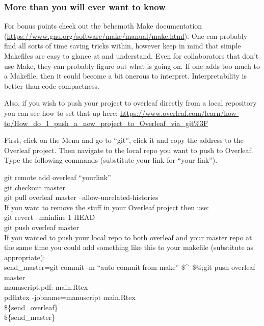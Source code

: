 \documentclass{article}
\begin{document}
\subsubsection{More than you will ever want to know}

For bonus points check out the behemoth {\sf Make} documentation (\url{https://www.gnu.org/software/make/manual/make.html}). One can probably find all sorts of time saving tricks within, however keep in mind that simple Makefiles are easy to glance at and understand. Even for collaborators that don't use {\sf Make}, they can probably figure out what is going on. If one adds too much to a Makefile, then it could become a bit onerous to interpret. Interpretability is better than code compactness.

Also, if you wish to push your project to overleaf directly from a local repository you can see how to set that up here: \url{https://www.overleaf.com/learn/how-to/How_do_I_push_a_new_project_to_Overleaf_via_git%3F}

First, click on the Menu and go to ``git'', click it and copy the address to the Overleaf project. Then navigate to the local repo you want to push to Overleaf. Type the following commands (substitute your link for ``your link'').

\noindent git remote add overleaf ``yourlink''\\
git checkout master \\%
git pull overleaf master --allow-unrelated-histories\\
If you want to remove the stuff in your Overleaf project then use: \\
git revert --mainline 1 HEAD\\
git push overleaf master\\

If you wanted to push your local repo to both overleaf and your master repo at the same time you could add something like this to your makefile (substitute as appropriate): \\
send\_master=git commit -m ``auto commit from make'' \$\textasciicircum\ \$$@$;git push overleaf master\\

manuscript.pdf: main.Rtex\\
\tab pdflatex -jobname=manuscript main.Rtex\\
\tab \$\{send\_overleaf\}\\
\tab \$\{send\_master\} \\
\end{document}

